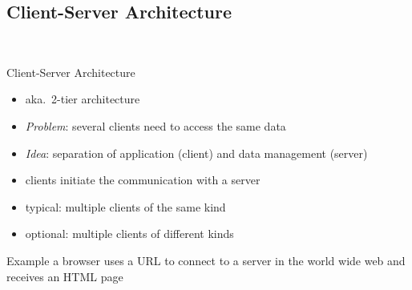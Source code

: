 \subsection{Client-Server Architecture}
\begin{frame}{\insertsubsection\ \normalsize{}}
	\begin{fancycolumns}[animation=none]
		\begin{definition}{Client-Server Architecture \mysource{\sommerville}}%
			\begin{itemize}
				\item aka.\ 2-tier architecture
				\item \emph{Problem}: several clients need to access the same data
				\item \emph{Idea}: separation of application (client) and data management (server)
				\item clients initiate the communication with a server
				\item typical: multiple clients of the same kind
				\item optional: multiple clients of different kinds
			\end{itemize}
		\end{definition}
		\begin{example}{Example}
			a browser uses a URL to connect to a server in the world wide web and receives an HTML page
		\end{example}
		\nextcolumn
	\end{fancycolumns}
\end{frame}

